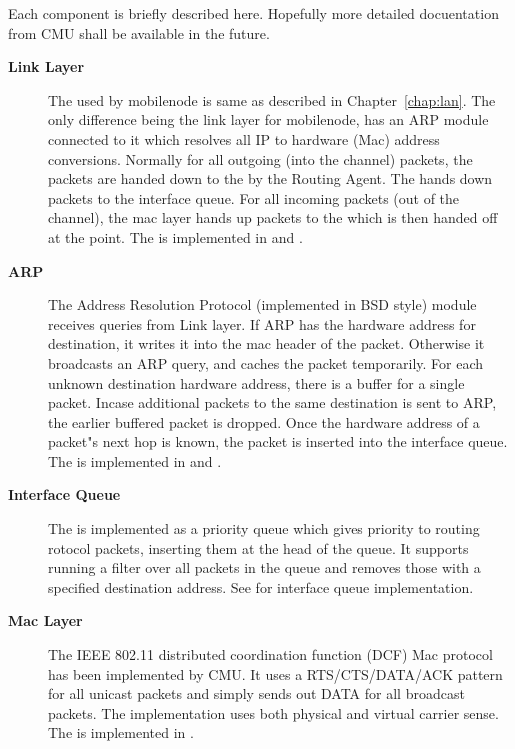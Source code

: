 Each component is briefly described here. Hopefully more detailed
docuentation from CMU shall be available in the future. 
\begin{description}
\item[{\bf Link Layer}] The  used by mobilenode is same as
  described in Chapter~\ref{chap:lan}. The only difference being the
  link layer for mobilenode, has an ARP module connected to it which
  resolves all IP to hardware (Mac) address conversions. Normally for
  all outgoing (into the channel) packets, the packets are handed down
  to the  by the Routing Agent. The  hands down
  packets to the interface queue. For all incoming packets (out of the
  channel), the mac layer hands up packets to the  which is
  then handed off at the  point. The
   is implemented in  and
  .

\item [{\bf ARP}] The Address Resolution Protocol (implemented in BSD
  style) module receives queries from Link layer. If ARP has the
  hardware address for destination, it writes it into the mac header
  of the packet. Otherwise it broadcasts an ARP query, and caches the
  packet temporarily. For each unknown destination hardware address,
  there is a buffer for a single packet. Incase additional packets to
  the same destination is sent to ARP, the earlier buffered packet is
  dropped. Once the hardware address of a
  packet"s next hop is known, the packet is inserted into the
  interface queue. The  is implemented
  in  and .

\item[{\bf Interface Queue}] The 
  is implemented as a priority queue which gives priority to routing  
  rotocol packets, inserting them at the head of the queue. It supports
  running a filter over all packets in the queue and removes those with
  a specified destination address. See  for 
  interface queue implementation.

\item[{\bf Mac Layer}] The IEEE 802.11 distributed coordination 
  function (DCF) Mac protocol has been implemented by CMU. It uses a 
  RTS/CTS/DATA/ACK pattern for all unicast packets and simply sends out
  DATA for all broadcast packets. The implementation uses both 
  physical and virtual carrier sense. The
   is implemented in
  .
  

\end{description}
